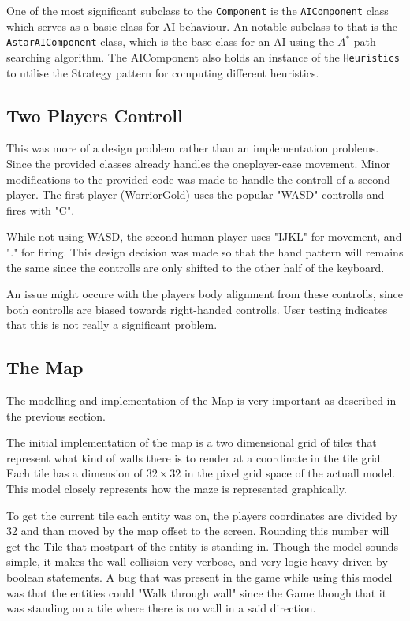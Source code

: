 \documentclass{article}
\begin{document}
  One of the most significant subclass to the \texttt{Component} is the \texttt{AIComponent} class which serves as a basic class for AI behaviour. An notable subclass to that is the \texttt{AstarAIComponent} class, which is the base class for an AI using the $A^*$ path searching algorithm. The AIComponent also holds an instance of the \texttt{Heuristics} to utilise the Strategy pattern for computing different heuristics.

  \subsection{Two Players Controll}
  This was more of a design problem rather than an implementation problems. Since the provided classes already handles the oneplayer-case movement. Minor modifications to the provided code was made to handle the controll of a second player. The first player (WorriorGold) uses the popular "WASD" controlls and fires with "C".

  While not using WASD, the second human player uses "IJKL" for movement, and "." for firing. This design decision was made so that the hand pattern will remains the same since the controlls are only shifted to the other half of the keyboard.

  An issue might occure with the players body alignment from these controlls, since both controlls are biased towards right-handed controlls. User testing indicates that this is not really a significant problem.

  \subsection{The Map}
  The modelling and implementation of the Map is very important as described in the previous section.

  The initial implementation of the map is a two dimensional grid of tiles that represent what kind of walls there is to render at a coordinate in the tile grid. Each tile has a dimension of $32\times32$ in the pixel grid space of the actuall model. This model closely represents how the maze is represented graphically.

  To get the current tile each entity was on, the players coordinates are divided by 32 and than moved by the map offset to the screen. Rounding this number will get the Tile that mostpart of the entity is standing in. Though the model sounds simple, it makes the wall collision very verbose, and very logic heavy driven by boolean statements. A bug that was present in the game while using this model was that the entities could "Walk through wall" since the Game though that it was standing on a tile where there is no wall in a said direction.
\end{document}
